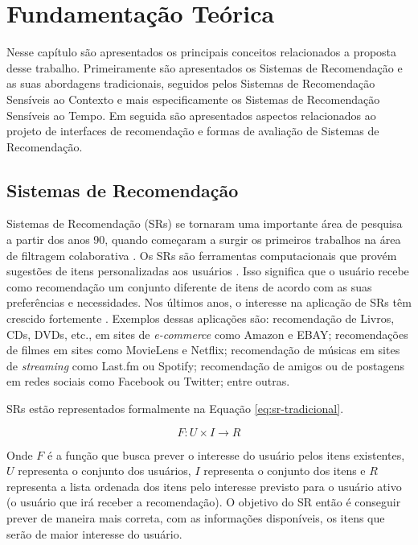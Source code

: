 \chapter{Fundamentação Teórica}\label{chapter:fundamentacao-teorica}

Nesse capítulo são apresentados os principais conceitos relacionados a proposta desse trabalho. Primeiramente são apresentados
os Sistemas de Recomendação e as suas abordagens tradicionais, seguidos pelos Sistemas de Recomendação Sensíveis ao Contexto
e mais especificamente os Sistemas de Recomendação Sensíveis ao Tempo. Em seguida são apresentados aspectos relacionados ao
projeto de interfaces de recomendação e formas de avaliação de Sistemas de Recomendação.

\section{Sistemas de Recomendação}

Sistemas de Recomendação (SRs) se tornaram uma importante área de pesquisa a partir dos anos 90, quando começaram a
surgir os primeiros trabalhos na área de filtragem colaborativa \cite{adomavicius2005toward}. Os SRs são ferramentas
computacionais que provém sugestões de itens personalizadas aos usuários \cite{ricci2011introduction}. Isso significa
que o usuário recebe como recomendação um conjunto diferente de itens de acordo com as suas preferências e necessidades.
Nos últimos anos, o interesse na aplicação de SRs têm crescido fortemente \cite{adomavicius2005toward, beel2016towards}.
Exemplos dessas aplicações são: recomendação de Livros, CDs, DVDs, etc., em sites de \textit{e-commerce} como Amazon e EBAY;
recomendações de filmes em sites como MovieLens e Netflix; recomendação de músicas em sites de \textit{streaming} como Last.fm ou
Spotify; recomendação de amigos ou de postagens em redes sociais como Facebook ou Twitter; entre outras.

SRs estão representados formalmente na Equação \ref{eq:sr-tradicional}.

\begin{equation}
  F: U \times I \rightarrow R
  \label{eq:sr-tradicional}
\end{equation}

Onde $F$ é a função que busca prever o interesse do usuário pelos itens existentes, $U$ representa o conjunto dos usuários,
$I$ representa o conjunto dos itens e $R$ representa a lista ordenada dos itens pelo interesse previsto para o usuário ativo
(o usuário que irá receber a recomendação). O objetivo do SR então é conseguir prever de maneira mais correta, com as
informações disponíveis, os itens que serão de maior interesse do usuário.

